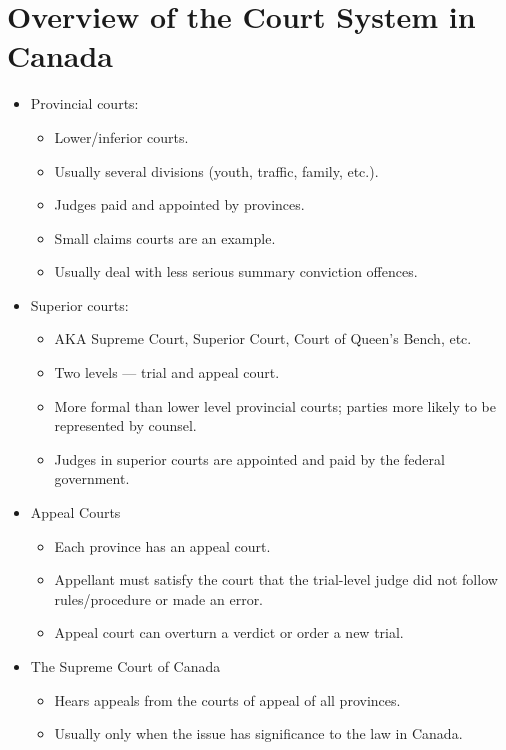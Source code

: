 \documentclass{article}
\begin{document}
\section{Overview of the Court System in Canada}
\begin{itemize}
    \item Provincial courts:
        \begin{itemize}
            \item Lower/inferior courts.
            \item Usually several divisions (youth,  traffic, family, etc.).
            \item Judges paid and appointed by provinces.
            \item Small claims courts are an example.
            \item Usually deal with less serious summary conviction offences.
        \end{itemize}
    \item Superior courts:
        \begin{itemize}
            \item AKA Supreme Court, Superior Court,  Court of Queen's Bench, etc.
            \item Two levels --- trial and appeal court.
            \item More formal than lower level provincial courts; parties more likely to be represented by counsel.
            \item Judges in superior courts are appointed and paid by the federal government.
        \end{itemize}
    \item Appeal Courts
        \begin{itemize}
            \item Each province has an appeal court.
            \item Appellant must satisfy the court that the trial-level judge did not follow rules/procedure or made an error.
            \item Appeal court can overturn a verdict or order a new trial.
        \end{itemize}
    \item The Supreme Court of Canada
        \begin{itemize}
            \item Hears appeals from the courts of appeal of all provinces.
            \item Usually only when the issue has significance to the law in Canada.

\end{itemize}
\end{itemize}
\end{document}
